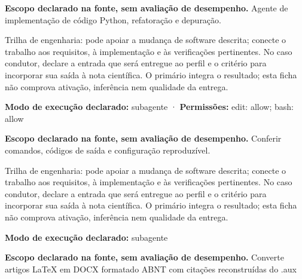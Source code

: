 \begin{descricao}
\textbf{Escopo declarado na fonte, sem avaliação de desempenho.}
Agente de implementação de código Python, refatoração e depuração.
\end{descricao}

\begin{funcao}
Trilha de engenharia: pode apoiar a mudança de software descrita; conecte o trabalho aos requisitos, à implementação e às verificações pertinentes. No caso condutor, declare a entrada que será entregue ao perfil e o critério para incorporar sua saída à nota científica. O primário integra o resultado; esta ficha não comprova ativação, inferência nem qualidade da entrega.
\end{funcao}

\begin{arquitetura}
\textbf{Modo de execução declarado:} subagente · \textbf{Permissões:} edit: allow; bash: allow
\end{arquitetura}


\begin{descricao}
\textbf{Escopo declarado na fonte, sem avaliação de desempenho.}
Conferir comandos, códigos de saída e configuração reproduzível.
\end{descricao}

\begin{funcao}
Trilha de engenharia: pode apoiar a mudança de software descrita; conecte o trabalho aos requisitos, à implementação e às verificações pertinentes. No caso condutor, declare a entrada que será entregue ao perfil e o critério para incorporar sua saída à nota científica. O primário integra o resultado; esta ficha não comprova ativação, inferência nem qualidade da entrega.
\end{funcao}

\begin{arquitetura}
\textbf{Modo de execução declarado:} subagente
\end{arquitetura}


\begin{descricao}
\textbf{Escopo declarado na fonte, sem avaliação de desempenho.}
Converte artigos LaTeX em DOCX formatado ABNT com citações reconstruídas do .aux
\end{descricao}

